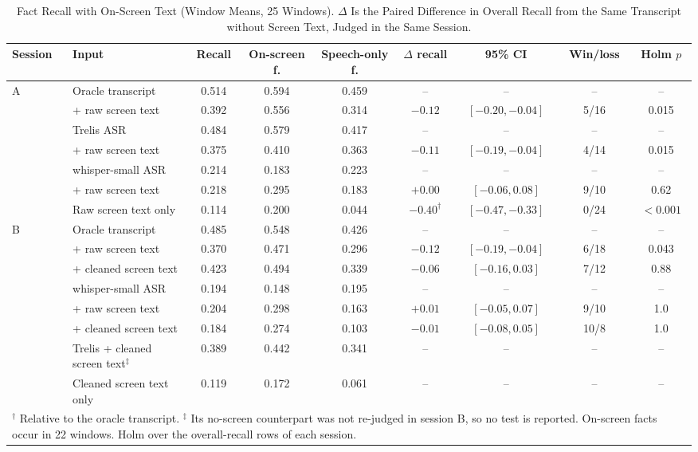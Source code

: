 \documentclass[conference]{IEEEtran}
\begin{document}
\begin{table}[t]
\caption{Fact Recall with On-Screen Text (Window Means, 25 Windows). $\Delta$ Is the Paired Difference in Overall Recall from the Same Transcript without Screen Text, Judged in the Same Session.}
\label{tab:screen}
\centering
\footnotesize
\setlength{\tabcolsep}{5pt}
\begin{tabular}{llccccccc}
\toprule
Session & Input & Recall & On-screen f. & Speech-only f. & $\Delta$ recall & 95\% CI & Win/loss & Holm $p$ \\
\midrule
\multirow{7}{*}{A} & Oracle transcript & 0.514 & 0.594 & 0.459 & -- & -- & -- & -- \\
 & \quad + raw screen text & 0.392 & 0.556 & 0.314 & $-0.12$ & $[-0.20, -0.04]$ & 5/16 & 0.015 \\
 & Trelis ASR & 0.484 & 0.579 & 0.417 & -- & -- & -- & -- \\
 & \quad + raw screen text & 0.375 & 0.410 & 0.363 & $-0.11$ & $[-0.19, -0.04]$ & 4/14 & 0.015 \\
 & whisper-small ASR & 0.214 & 0.183 & 0.223 & -- & -- & -- & -- \\
 & \quad + raw screen text & 0.218 & 0.295 & 0.183 & $+0.00$ & $[-0.06, 0.08]$ & 9/10 & 0.62 \\
 & Raw screen text only & 0.114 & 0.200 & 0.044 & $-0.40^{\dagger}$ & $[-0.47, -0.33]$ & 0/24 & $<0.001$ \\
\midrule
\multirow{8}{*}{B} & Oracle transcript & 0.485 & 0.548 & 0.426 & -- & -- & -- & -- \\
 & \quad + raw screen text & 0.370 & 0.471 & 0.296 & $-0.12$ & $[-0.19, -0.04]$ & 6/18 & 0.043 \\
 & \quad + cleaned screen text & 0.423 & 0.494 & 0.339 & $-0.06$ & $[-0.16, 0.03]$ & 7/12 & 0.88 \\
 & whisper-small ASR & 0.194 & 0.148 & 0.195 & -- & -- & -- & -- \\
 & \quad + raw screen text & 0.204 & 0.298 & 0.163 & $+0.01$ & $[-0.05, 0.07]$ & 9/10 & 1.0 \\
 & \quad + cleaned screen text & 0.184 & 0.274 & 0.103 & $-0.01$ & $[-0.08, 0.05]$ & 10/8 & 1.0 \\
 & Trelis + cleaned screen text$^{\ddagger}$ & 0.389 & 0.442 & 0.341 & -- & -- & -- & -- \\
 & Cleaned screen text only & 0.119 & 0.172 & 0.061 & -- & -- & -- & -- \\
\bottomrule
\multicolumn{9}{p{0.92\textwidth}}{\scriptsize $^{\dagger}$ Relative to the oracle transcript. $^{\ddagger}$ Its no-screen counterpart was not re-judged in session B, so no test is reported. On-screen facts occur in 22 windows. Holm over the overall-recall rows of each session.}
\end{tabular}
\end{table}
\end{document}
